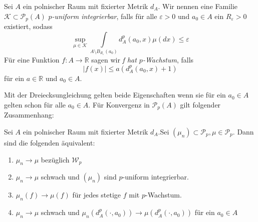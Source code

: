 \begin{definition}
    Sei $A$ ein polnischer Raum mit fixierter Metrik $d_A$. Wir nennen eine Familie $\mathcal{K} \subset \mathcal{P}_p(A)$ \emph{$p$-uniform integrierbar}, falls für alle $\varepsilon>0$ und $a_0 \in A$ ein $R_\varepsilon>0$ existiert, sodass
    $$\sup\limits_{\mu \in \mathcal{K}} \int\limits_{A\setminus B_{R_\varepsilon}(a_0)} d_A^p(a_0, x)\mu(dx) \leq \varepsilon $$
    Für eine Funktion $f: A \rightarrow \mathbb{R}$ sagen wir \emph{f hat $p$-Wachstum}, falls 
    $$|f(x)|\leq a(d_A^p(a_0, x) + 1)$$
    für ein $a\in \mathbb{R}$ und $a_0 \in A$.
\end{definition}
Mit der Dreiecksungleichung gelten beide Eigenschaften wenn sie für ein $a_0 \in A$ gelten schon für alle $a_0 \in A$.
Für Konvergenz in $\mathcal{P}_p(A)$ gilt folgender Zusammenhang:
\begin{lemma}\label{thm:conv_char}
Sei $A$ ein polnischer Raum mit fixierter Metrik $d_A$.Sei $(\mu_n) \subset \mathcal{P}_p, \mu \in \mathcal{P}_p$. Dann sind die folgenden äquivalent:
\begin{enumerate}
    \item $\mu_n \rightarrow \mu$ bezüglich $\mathcal{W}_p$
    \item $\mu_n \rightarrow \mu$ schwach und $(\mu_n)$ sind $p$-uniform integrierbar.
    \item $\mu_n(f) \rightarrow \mu(f)$ für jedes stetige $f$ mit $p$-Wachstum.
    \item $\mu_n \rightarrow \mu$ schwach und $\mu_n(d_A^p(\cdot, a_0)) \rightarrow \mu(d_A^p(\cdot, a_0))$ für ein $a_0 \in A$
\end{enumerate}
\end{lemma}
